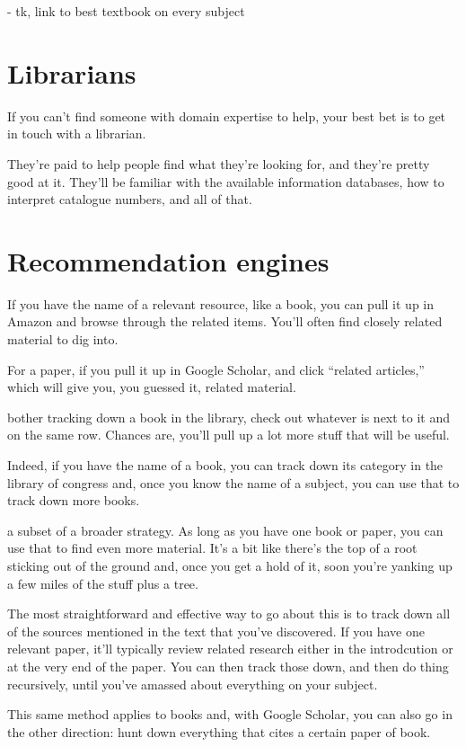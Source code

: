 - tk, link to best textbook on every subject

\section{Librarians}

If you can't find someone with domain expertise to help, your best bet is to get
in touch with a librarian.

They're paid to help people find what they're looking for, and they're pretty
good at it. They'll be familiar with the available information databases, how to
interpret catalogue numbers, and all of that. 

\section{Recommendation engines}

If you have the name of a relevant resource, like a book, you can pull it up in
Amazon and browse through the related items. You'll often find closely related
material to dig into.

For a paper, if you pull it up in Google Scholar, and click ``related
articles,'' which will give you, you guessed it, related material.

 bother tracking down a book in the library, check out whatever
is next to it and on the same row. Chances are, you'll pull up a lot more stuff
that will be useful.

Indeed, if you have the name of a book, you can track down its category in the
library of congress and, once you know the name of a subject, you can use that
to track down more books.

 a subset of a broader strategy. As long as you have one
book or paper, you can use that to find even more material. It's a bit like
there's the top of a root sticking out of the ground and, once you get a hold of
it, soon you're yanking up a few miles of the stuff plus a tree.

The most straightforward and effective way to go about this is to track down all
of the sources mentioned in the text that you've discovered. If you have one
relevant paper, it'll typically review related research either in the
introdcution or at the very end of the paper. You can then track those down, and
then do thing recursively, until you've amassed about everything on your
subject.

This same method applies to books and, with Google Scholar, you can also go in
the other direction: hunt down everything that cites a certain paper of book.

